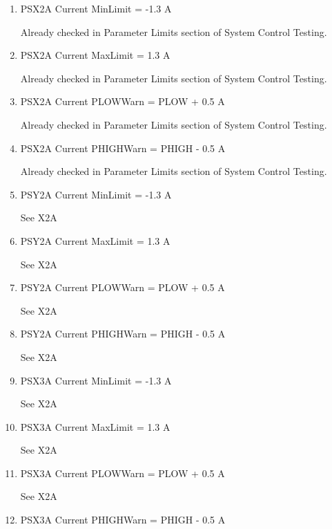 \documentclass[11pt]{book}		%
\begin{document}
\begin{enumerate}
 \item PSX2A Current MinLimit = -1.3 A

\color{red}
Already checked in Parameter Limits section of System Control Testing.
\color{black}

 \item PSX2A Current MaxLimit = 1.3 A

\color{red}
Already checked in Parameter Limits section of System Control Testing.
\color{black}

 \item PSX2A Current PLOWWarn = PLOW + 0.5 A

\color{red}
Already checked in Parameter Limits section of System Control Testing.
\color{black}

 \item PSX2A Current PHIGHWarn = PHIGH - 0.5 A

\color{red}
Already checked in Parameter Limits section of System Control Testing.
\color{black}

 \item PSY2A Current MinLimit = -1.3 A

\color{red}
See X2A
\color{black}

 \item PSY2A Current MaxLimit = 1.3 A

\color{red}
See X2A
\color{black}

 \item PSY2A Current PLOWWarn = PLOW + 0.5 A

\color{red}
See X2A
\color{black}

 \item PSY2A Current PHIGHWarn = PHIGH - 0.5 A

\color{red}
See X2A
\color{black}

 \item PSX3A Current MinLimit = -1.3 A

\color{red}
See X2A
\color{black}

 \item PSX3A Current MaxLimit = 1.3 A

\color{red}
See X2A
\color{black}

 \item PSX3A Current PLOWWarn = PLOW + 0.5 A

\color{red}
See X2A
\color{black}

 \item PSX3A Current PHIGHWarn = PHIGH - 0.5 A


\end{enumerate}
\end{document}
